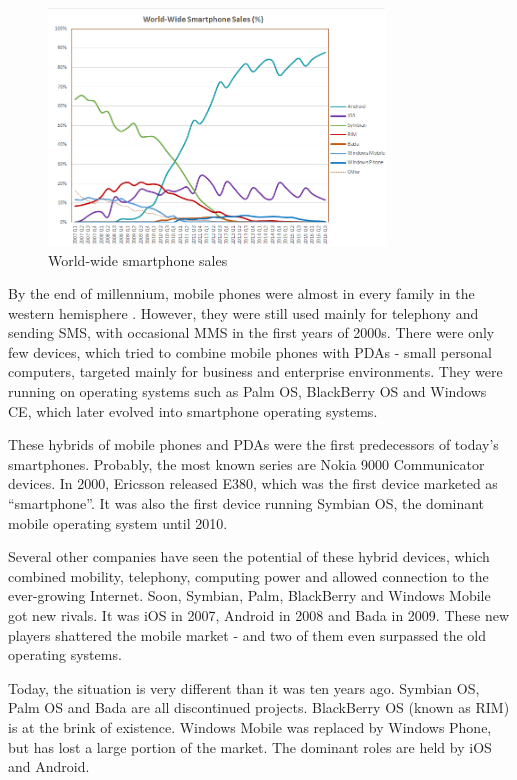 \documentclass[english,master,public,dept460,male,cpdeclaration,oneside]{diploma}
\begin{document}
\begin{figure}[!ht]
\centering\includegraphics[width=0.8\textwidth]{Figures/World_Wide_Smartphone_Sales_Share.png}
\caption{World-wide smartphone sales \cite{wikiSmartphoneSales}}
\end{figure}

By the end of millennium, mobile phones were almost in every family in the western hemisphere \cite{worldBank}. However, they were still used mainly for telephony and sending SMS, with occasional MMS in the first years of 2000s. There were only few devices, which tried to combine mobile phones with PDAs - small personal computers, targeted mainly for business and enterprise environments. They were running on operating systems such as Palm OS, BlackBerry OS and Windows CE, which later evolved into smartphone operating systems.

These hybrids of mobile phones and PDAs were the first predecessors of today’s smartphones. Probably, the most known series are Nokia 9000 Communicator devices. In 2000, Ericsson released E380, which was the first device marketed as “smartphone”. It was also the first device running Symbian OS, the dominant mobile operating system until 2010.

Several other companies have seen the potential of these hybrid devices, which combined mobility, telephony, computing power and allowed connection to the ever-growing Internet. Soon, Symbian, Palm, BlackBerry and Windows Mobile got new rivals. It was iOS in 2007, Android in 2008 and Bada in 2009. These new players shattered the mobile market - and two of them even surpassed the old operating systems. 

Today, the situation is very different than it was ten years ago. Symbian OS, Palm OS and Bada are all discontinued projects. BlackBerry OS (known as RIM) is at the brink of existence. Windows Mobile was replaced by Windows Phone, but has lost a large portion of the market. The dominant roles are held by iOS and Android.
\end{document}
